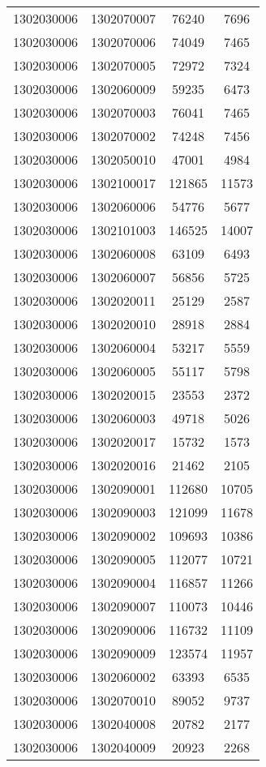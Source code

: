 \begin{longtable}{llcc}
1302030006 & 1302070007 & 76240 & 7696\\
1302030006 & 1302070006 & 74049 & 7465\\
1302030006 & 1302070005 & 72972 & 7324\\
1302030006 & 1302060009 & 59235 & 6473\\
1302030006 & 1302070003 & 76041 & 7465\\
1302030006 & 1302070002 & 74248 & 7456\\
1302030006 & 1302050010 & 47001 & 4984\\
1302030006 & 1302100017 & 121865 & 11573\\
1302030006 & 1302060006 & 54776 & 5677\\
1302030006 & 1302101003 & 146525 & 14007\\
1302030006 & 1302060008 & 63109 & 6493\\
1302030006 & 1302060007 & 56856 & 5725\\
1302030006 & 1302020011 & 25129 & 2587\\
1302030006 & 1302020010 & 28918 & 2884\\
1302030006 & 1302060004 & 53217 & 5559\\
1302030006 & 1302060005 & 55117 & 5798\\
1302030006 & 1302020015 & 23553 & 2372\\
1302030006 & 1302060003 & 49718 & 5026\\
1302030006 & 1302020017 & 15732 & 1573\\
1302030006 & 1302020016 & 21462 & 2105\\
1302030006 & 1302090001 & 112680 & 10705\\
1302030006 & 1302090003 & 121099 & 11678\\
1302030006 & 1302090002 & 109693 & 10386\\
1302030006 & 1302090005 & 112077 & 10721\\
1302030006 & 1302090004 & 116857 & 11266\\
1302030006 & 1302090007 & 110073 & 10446\\
1302030006 & 1302090006 & 116732 & 11109\\
1302030006 & 1302090009 & 123574 & 11957\\
1302030006 & 1302060002 & 63393 & 6535\\
1302030006 & 1302070010 & 89052 & 9737\\
1302030006 & 1302040008 & 20782 & 2177\\
1302030006 & 1302040009 & 20923 & 2268\\

\end{longtable}
